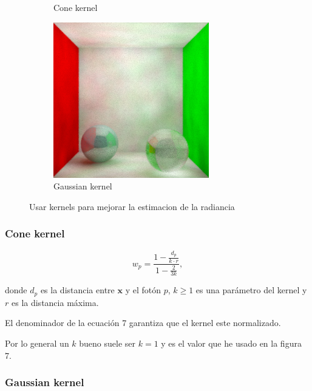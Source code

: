 \documentclass{article}
\begin{document}
\begin{figure}
\begin{subfigure}[h]{0.32\linewidth}
\caption{Cone kernel}
\end{subfigure}
\hfill
\begin{subfigure}[h]{0.32\linewidth}
\includegraphics[width=\linewidth]{imgs/gaussian.png}
\caption{Gaussian kernel}
\end{subfigure}
\caption{Usar kernels para mejorar la estimacion de la radiancia}
\end{figure}

\subsubsection{Cone kernel}

\begin{equation}
w_p = \frac{1 - \frac{d_p}{k \cdot r}}{1 - \frac{2}{3k}},
\end{equation}

donde \(d_p\) es la distancia entre \(\mathbf{x}\) y el fotón \(p\), \(k \ge 1\) es una parámetro del kernel y \(r\) es la distancia máxima. \cite{HenrikCourse8}

El denominador de la ecuación 7 garantiza que el kernel este normalizado.

Por lo general un \(k\) bueno suele ser \(k=1\) y es el valor que he usado en la figura 7.

\subsubsection{Gaussian kernel}
\end{document}
